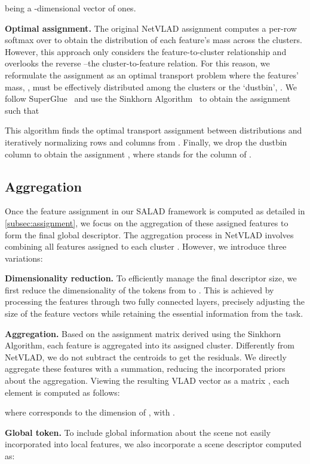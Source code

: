 \documentclass[10pt,twocolumn,letterpaper]{article}
\begin{document}
\noindent being  a -dimensional vector of ones.

\textbf{Optimal assignment.} The original NetVLAD assignment computes a per-row softmax over  to obtain the distribution of each feature's mass across the clusters. However, this approach only considers the feature-to-cluster relationship and overlooks the reverse --the cluster-to-feature relation. For this reason, we reformulate the assignment as an optimal transport problem where the features' mass, , must be effectively distributed among the clusters or the `dustbin', . We follow SuperGlue~\cite{sarlin2020superglue} and use the Sinkhorn Algorithm~\cite{cuturi2013sinkhorn,sinkhorn1967concerning} to obtain the assignment  such that

This algorithm finds the optimal transport assignment between distributions  and  iteratively normalizing rows and columns from . Finally, we drop the dustbin column to obtain the assignment , where  stands for the  column of .

\subsection{Aggregation}
\label{subsec:aggregation}

Once the feature assignment in our SALAD framework is computed as detailed in \cref{subsec:assignment}, we focus on the aggregation of these assigned features to form the final global descriptor. The aggregation process in NetVLAD involves combining all features assigned to each cluster . However, we introduce three variations:

\textbf{Dimensionality reduction.} To efficiently manage the final descriptor size, we first reduce the dimensionality of the tokens from  to . This is achieved by processing the features through two fully connected layers, precisely adjusting the size of the feature vectors while retaining the essential information from the task. 

\textbf{Aggregation.} Based on the assignment matrix derived using the Sinkhorn Algorithm, each feature is aggregated into its assigned cluster. Differently from NetVLAD, we do not subtract the centroids to get the residuals. We directly aggregate these features with a summation, reducing the incorporated priors about the aggregation. Viewing the resulting VLAD vector as a matrix , each element  is computed as follows:

where  corresponds to the  dimension of , with .

\textbf{Global token.} To include global information about the scene not easily incorporated into local features, we also incorporate a scene descriptor  computed as:
\end{document}
